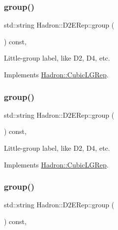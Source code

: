 \subsubsection{\texorpdfstring{group()}{group()}\hspace{0.1cm}{\footnotesize\ttfamily [3/5]}}
{\footnotesize\ttfamily std\+::string Hadron\+::\+D2\+E\+Rep\+::group (\begin{DoxyParamCaption}{ }\end{DoxyParamCaption}) const\hspace{0.3cm}{\ttfamily [inline]}, {\ttfamily [virtual]}}

Little-\/group label, like D2, D4, etc. 

Implements \mbox{\hyperlink{structHadron_1_1CubicLGRep_a9bdb14b519a611d21379ed96a3a9eb41}{Hadron\+::\+Cubic\+L\+G\+Rep}}.

\mbox{\label{structHadron_1_1D2ERep_a7a2b734e04205943bbaa64c4b26147c9}} 
\subsubsection{\texorpdfstring{group()}{group()}\hspace{0.1cm}{\footnotesize\ttfamily [4/5]}}
{\footnotesize\ttfamily std\+::string Hadron\+::\+D2\+E\+Rep\+::group (\begin{DoxyParamCaption}{ }\end{DoxyParamCaption}) const\hspace{0.3cm}{\ttfamily [inline]}, {\ttfamily [virtual]}}

Little-\/group label, like D2, D4, etc. 

Implements \mbox{\hyperlink{structHadron_1_1CubicLGRep_a9bdb14b519a611d21379ed96a3a9eb41}{Hadron\+::\+Cubic\+L\+G\+Rep}}.

\mbox{\label{structHadron_1_1D2ERep_a7a2b734e04205943bbaa64c4b26147c9}} 
\subsubsection{\texorpdfstring{group()}{group()}\hspace{0.1cm}{\footnotesize\ttfamily [5/5]}}
{\footnotesize\ttfamily std\+::string Hadron\+::\+D2\+E\+Rep\+::group (\begin{DoxyParamCaption}{ }\end{DoxyParamCaption}) const\hspace{0.3cm}{\ttfamily [inline]}, {\ttfamily [virtual]}}

